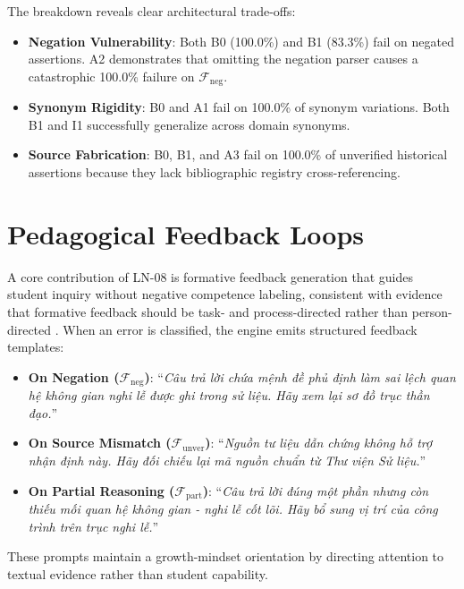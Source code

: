 \documentclass[11pt,a4paper]{article}
\begin{document}


The breakdown reveals clear architectural trade-offs:
\begin{itemize}[leftmargin=*]
    \item \textbf{Negation Vulnerability}: Both B0 (100.0\%) and B1 (83.3\%) fail on negated assertions. A2 demonstrates that omitting the negation parser causes a catastrophic 100.0\% failure on $\mathcal{F}_{\text{neg}}$.
    \item \textbf{Synonym Rigidity}: B0 and A1 fail on 100.0\% of synonym variations. Both B1 and I1 successfully generalize across domain synonyms.
    \item \textbf{Source Fabrication}: B0, B1, and A3 fail on 100.0\% of unverified historical assertions because they lack bibliographic registry cross-referencing.
\end{itemize}

\section{Pedagogical Feedback Loops}
A core contribution of LN-08 is formative feedback generation that guides student inquiry without negative competence labeling, consistent with evidence that formative feedback should be task- and process-directed rather than person-directed \cite{shute2008focus, hattie2007power}. When an error is classified, the engine emits structured feedback templates:
\begin{itemize}[leftmargin=*]
    \item \textbf{On Negation ($\mathcal{F}_{\text{neg}}$)}: ``\textit{Câu trả lời chứa mệnh đề phủ định làm sai lệch quan hệ không gian nghi lễ được ghi trong sử liệu. Hãy xem lại sơ đồ trục thần đạo.}''
    \item \textbf{On Source Mismatch ($\mathcal{F}_{\text{unver}}$)}: ``\textit{Nguồn tư liệu dẫn chứng không hỗ trợ nhận định này. Hãy đối chiếu lại mã nguồn chuẩn từ Thư viện Sử liệu.}''
    \item \textbf{On Partial Reasoning ($\mathcal{F}_{\text{part}}$)}: ``\textit{Câu trả lời đúng một phần nhưng còn thiếu mối quan hệ không gian - nghi lễ cốt lõi. Hãy bổ sung vị trí của công trình trên trục nghi lễ.}''
\end{itemize}
These prompts maintain a growth-mindset orientation by directing attention to textual evidence rather than student capability.
\end{document}
